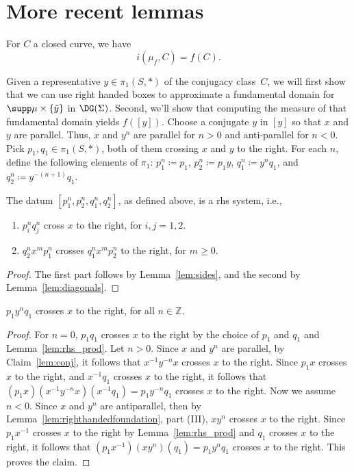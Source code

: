 \section{More recent lemmas}

\begin{proposition}
For $C$ a closed curve, we have
\[
i(\mu_f,C)=f(C).
\]
\label{prop:recoverintersection}
\end{proposition}

  Given a representative $y \in \pi_1(S,*)$ of the conjugacy class~$C$, we will first show that we can use right handed boxes to approximate a fundamental domain for $\supp \mu \times \{ \tilde{y} \}$ in $\DG(\Sigma)$.
Second, we'll show that computing the measure of that fundamental domain yields $f([y])$.
Choose a conjugate $y$ in $[y]$ so that $x$ and $y$ are parallel. Thus, $x$ and $y^n$ are parallel for $n>0$ and anti-parallel for $n<0$.
Pick $p_1, q_1 \in \pi_1(S,*)$, both of them crossing $x$ and $y$ to the right.
For each $n$, define the following elements of $\pi_1$: $p_1^n \coloneqq p_1$, $p_2^n \coloneqq p_1 y$, $q_1^n \coloneqq y^n q_1$, and $q_2^n \coloneqq y^{-(n+1)} q_1$.
\begin{proposition}
The datum $[p_1^n,p_2^n,q_1^n,q_2^n]$, as defined above, is a rhs system, i.e.,
\begin{enumerate}
    \item $p_i^nq_j^n$ cross $x$ to the right, for $i,j=1,2$.
    \item $q_2^n x^m p_1^n$ crosses $q_1^n x^m p_2^n$ to the right, for $m \geq 0$. 
\end{enumerate}
\end{proposition}
\begin{proof}
The first part follows by Lemma~\ref{lem:sides}, and the second by Lemma~\ref{lem:diagonals}.
\end{proof}


\begin{lemma}
 $p_1 y^n q_1$ crosses $x$ to the right, for all $n \in \mathbb{Z}$.
 \label{lem:sides}
\end{lemma}
\begin{proof}
For $n=0$, $p_1 q_1$ crosses $x$ to the right by the choice of $p_1$ and $q_1$ and Lemma~\ref{lem:rhs_prod}.
Let $n>0$. Since $x$ and $y^n$ are parallel, by Claim~\ref{lem:conj}, it follows that $x^{-1}y^{-n}x$ crosses $x$ to the right.
Since $p_1x$ crosses $x$ to the right, and $x^{-1}q_1$ crosses $x$ to the right, it follows that $(p_1x)(x^{-1}y^{-n}x)(x^{-1}q_1)=p_1y^{-n}q_1$ crosses $x$ to the right. 
Now we assume $n<0$.
Since $x$ and $y^n$ are antiparallel, then by Lemma~\ref{lem:righthandedfoundation}, part (III), $xy^{n}$ crosses $x$ to the right.
Since $p_1x^{-1}$ crosses $x$ to the right by Lemma~\ref{lem:rhs_prod} and $q_1$ crosses $x$ to the right, it follows that $(p_1x^{-1})(xy^{n})(q_1)=p_1y^{n}q_1$ crosses $x$ to the right. This proves the claim.
\end{proof}

